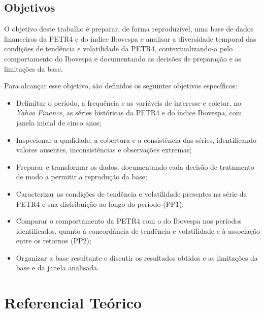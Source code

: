 \documentclass[12pt,a4paper]{article}
\begin{document}

\subsection{Objetivos}\label{sec:objetivos}

O objetivo deste trabalho é preparar, de forma reproduzível, uma base de dados
financeiros da PETR4 e do índice Ibovespa e analisar a diversidade temporal das
condições de tendência e volatilidade da PETR4, contextualizando-a pelo
comportamento do Ibovespa e documentando as decisões de preparação e as
limitações da base.

Para alcançar esse objetivo, são definidos os seguintes objetivos específicos:

\begin{itemize}
  \item Delimitar o período, a frequência e as variáveis de interesse e coletar,
    no \textit{Yahoo Finance}, as séries históricas da PETR4 e do índice
    Ibovespa, com janela inicial de cinco anos;
  \item Inspecionar a qualidade, a cobertura e a consistência das séries,
    identificando valores ausentes, inconsistências e observações extremas;
  \item Preparar e transformar os dados, documentando cada decisão de tratamento
    de modo a permitir a reprodução da base;
  \item Caracterizar as condições de tendência e volatilidade presentes na série
    da PETR4 e sua distribuição ao longo do período (PP1);
  \item Comparar o comportamento da PETR4 com o do Ibovespa nos períodos
    identificados, quanto à concordância de tendência e volatilidade e à
    associação entre os retornos (PP2);
  \item Organizar a base resultante e discutir os resultados obtidos e as
    limitações da base e da janela analisada.
\end{itemize}

\section{Referencial Teórico}\label{sec:referencial}
\end{document}
